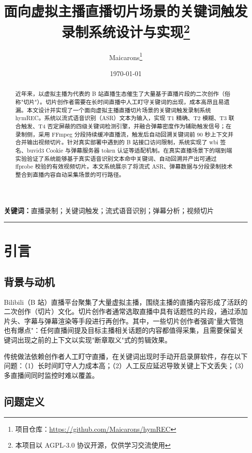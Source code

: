 \documentclass[UTF8,11pt,a4paper]{ctexart}
\title{\textbf{面向虚拟主播直播切片场景的关键词触发录制系统设计与实现}\thanks{本项目以 AGPL-3.0 协议开源，仅供学习交流使用}}
\author{Maicarons\thanks{项目仓库：\url{https://github.com/Maicarons/hymREC}}}
\date{\today}
\begin{document}
\maketitle

\begin{abstract}
近年来，以虚拟主播为代表的 B 站直播生态催生了大量基于直播片段的二次创作（俗称"切片"）。切片创作者需要在长时间直播中人工盯守关键词的出现，成本高昂且易遗漏。本文设计并实现了一个面向虚拟主播直播切片场景的关键词触发录制系统 hymREC。系统以流式语音识别（ASR）文本为输入，实现 T1 精确、T2 模糊、T3 联合触发、T4 否定屏蔽的四级关键词检测引擎，并融合弹幕密度作为辅助触发信号；在录制侧，采用 FFmpeg 分段持续缓冲直播流，触发后自动回溯关键词前 90 秒上下文并合并输出视频切片。针对真实部署中遇到的 B 站接口访问限制，系统实现了 wbi 签名、buvid3 Cookie 与弹幕服务器 token 认证等适配机制。在真实直播场景下的端到端实验验证了系统能够基于真实语音识别文本命中关键词、自动回溯并产出可通过 ffprobe 校验的有效视频切片。本文系统展示了将流式 ASR、弹幕数据与分段录制技术整合到直播内容自动采集场景的可行路径。
\end{abstract}

\noindent\textbf{关键词：}直播录制；关键词触发；流式语音识别；弹幕分析；视频切片

\begin{center}
\rule{\textwidth}{0.4pt}
\end{center}

\section{引言}

\subsection{背景与动机}

Bilibili（B 站）直播平台聚集了大量虚拟主播，围绕主播的直播内容形成了活跃的二次创作（切片）文化。切片创作者通常选取直播中具有话题性的片段，通过添加片头、字幕与弹幕渲染等手段进行再创作。其中，一些切片创作者强调"量大管饱也有爆点"：任何直播间提及目标主播相关话题的内容都值得采集，且需要保留关键词出现之前的上下文以实现"断章取义"式的剪辑效果。

传统做法依赖创作者人工盯守直播，在关键词出现时手动开启录屏软件，存在以下问题：（1）长时间盯守人力成本高；（2）人工反应延迟导致关键上下文丢失；（3）多直播间同时监控时难以覆盖。

\subsection{问题定义}
\end{document}
